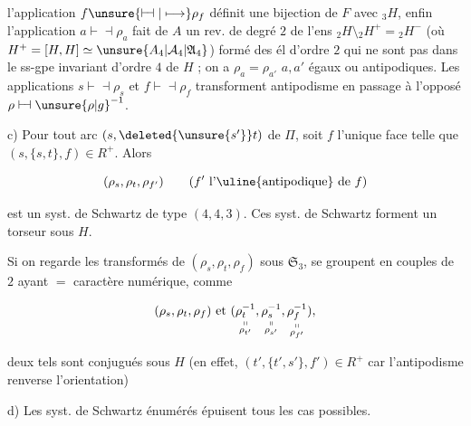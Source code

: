 
l'application $f\unsure{\mathrel{\vdash\!\dashv}|\longmapsto}\rho_f$ définit une bijection de $F$ avec $ {}_3H$, enfin l'application $a\mathrel{\vdash\!\dashv}\rho_a$ fait de $A$ un rev. de degré $2$ de  l'ens $ {}_2H\setminus {}_2H^{+}={}_2H^{-}$ (où $H^{+}=[H,H]\simeq\unsure{A_4|\mathcal A_4|\mathfrak A_4}$) formé des él d'ordre $2$ qui ne sont pas dans le ss-gpe invariant d'ordre $4$ de $H$ ; on a $\rho_a=\rho_{a'}$  $a,a'$ égaux ou antipodiques. Les applications $s\mathrel{\vdash\!\dashv}\rho_s$ et $f\mathrel{\vdash\!\dashv}\rho_f$ transforment antipodisme en passage à l'opposé $\rho\mathrel{\vdash\!\dashv}{\unsure{\rho|g}}^{-1}$.

c) Pour tout arc $(s,\deleted{\unsure{s'}}t)$ de $\Pi$, soit $f$ l'unique face telle que $(s,\{s,t\},f)\in R^{+}$.  Alors

\[
(\rho_s,\rho_t,\rho_{f'})\qquad(f'\ \text{l'\uline{antipodique} de }f)
\]

est un syst. de Schwartz de type $(4,4,3)$.  Ces syst. de Schwartz forment un torseur sous $H$.



Si on regarde les  transformés de $(\rho_s,\rho_t,\rho_f)$ sous $\mathfrak S_3$, se groupent en couples de $2$ ayant $=$ caractère numérique, comme

\[
(\rho_s,\rho_t,\rho_f)\text{ et }
(\underset{\substack{\shortparallel\\\rho_{t'}}}{\rho_t^{-1}},
 \underset{\substack{\shortparallel\\\rho_{s'}}}{\rho_s^{-1}},
 \underset{\substack{\shortparallel\\\rho_{f'}}}{\rho_f^{-1}}),
\]

deux tels sont conjugués sous $H$ (en effet, $(t',\{t',s'\},f')\in R^{+}$ car l'antipodisme renverse l'orientation)

d) Les syst. de Schwartz énumérés épuisent tous les cas possibles.

